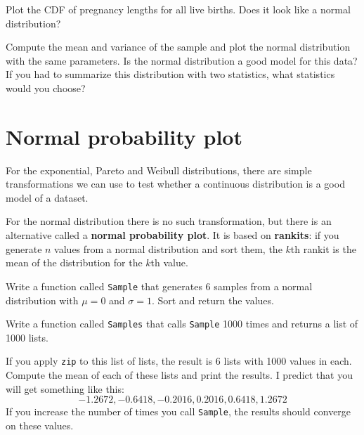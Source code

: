 \documentclass[12pt]{book}
\begin{document}
\begin{ex}

Plot the CDF of pregnancy lengths for all live births.  Does it
look like a normal distribution?


Compute the mean and variance of the sample and plot the normal
distribution with the same parameters.  Is the normal distribution a
good model for this data?  If you had to summarize this distribution
with two statistics, what statistics would you choose?

\end{ex}


\section{Normal probability plot}


For the exponential, Pareto and Weibull distributions, there are
simple transformations we can use to test whether a continuous
distribution is a good model of a dataset.


For the normal distribution there is no such transformation, but there
is an alternative called a {\bf normal probability plot}.  It is based
on {\bf rankits}: if you generate $n$ values from a normal
distribution and sort them, the $k$th rankit is the mean of the
distribution for the $k$th value.


\begin{ex}

Write a function called {\tt Sample} that generates 6 samples from a
normal distribution with $\mu = 0$ and $\sigma = 1$.  Sort and return
the values.

Write a function called {\tt Samples} that calls {\tt Sample} 1000 times and
returns a list of 1000 lists.

If you apply {\tt zip} to this list of lists, the result is 6 lists
with 1000 values in each.  Compute the mean of each of these lists
and print the results.  I predict that you will get something like
this:
%
\[ -1.2672,   -0.6418,   -0.2016,   0.2016,   0.6418,   1.2672 \]
%
If you increase the number of times you call {\tt Sample}, the
results should converge on these values.

\end{ex}
\end{document}
